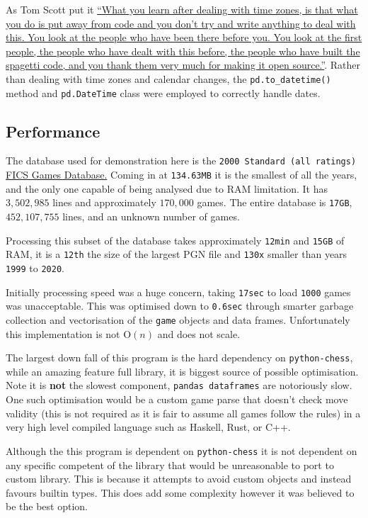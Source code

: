 \documentclass[bigger]{beamer}
\begin{document}
As Tom Scott put it \href{https://youtu.be/-5wpm-gesOY}{``What you learn after dealing with time zones, is that what you do is put away from code and you don't try and write anything to deal with this. You look at the people who have been there before you. You look at the first people, the people who have dealt with this before, the people who have built the spagetti code, and you thank them very much for making it open source.''}. Rather than dealing with time zones and calendar changes, the \texttt{pd.to\_datetime()} method and \texttt{pd.DateTime} class were employed to correctly handle dates.
\subsection{Performance}
\label{sec:orgb791e9f}
The database used for demonstration here is the \texttt{2000 Standard (all ratings)} \href{https://www.ficsgames.org/download.html}{FICS Games Database.} Coming in at \texttt{134.63MB} it is the smallest of all the years, and the only one capable of being analysed due to RAM limitation. It has \(3,502,985\) lines and approximately \(170,000\) games. The entire database is \texttt{17GB}, \(452,107,755\) lines, and an unknown number of games.

Processing this subset of the database takes approximately \texttt{12min} and \texttt{15GB} of RAM, it is a \texttt{12th} the size of the largest PGN file and \texttt{130x} smaller than years \texttt{1999} to \texttt{2020}.

Initially processing speed was a huge concern, taking \texttt{17sec} to load \texttt{1000} games was unacceptable. This was optimised down to \texttt{0.6sec} through smarter garbage collection and vectorisation of the \texttt{game} objects and data frames. Unfortunately this implementation is not \(\text{O}(n)\) and does not scale.

The largest down fall of this program is the hard dependency on \texttt{python-chess}, while an amazing feature full library, it is biggest source of possible optimisation. Note it is \textbf{not} the slowest component, \texttt{pandas dataframes} are notoriously slow. One such optimisation would be a custom game parse that doesn't check move validity (this is not required as it is fair to assume all games follow the rules) in a very high level compiled language such as Haskell, Rust, or C++.

Although the this program is dependent on \texttt{python-chess} it is not dependent on any specific competent of the library that would be unreasonable to port to custom library. This is because it attempts to avoid custom objects and instead favours builtin types. This does add some complexity however it was believed to be the best option.
\end{document}
